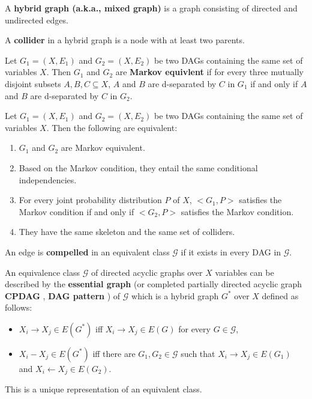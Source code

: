 \begin{definition}
A \textbf{hybrid graph (a.k.a., mixed graph)} is a graph consisting of directed and undirected edges. 
\end{definition}

\begin{definition}
A \textbf{collider} in a hybrid graph is a node with at least two parents. 
\end{definition}

\begin{definition}
Let $G_1 = (X, E_1)$ and $G_2 = (X, E_2)$ be two DAGs containing the same set of variables $X$. Then $G_1$ and $G_2$ are \textbf{Markov equivlent} if for every three mutually disjoint subsets $A, B, C \subseteq X$, $A$ and $B$ are d-separated by $C$ in $G_1$ if and only if $A$ and $B$ are d-separated by $C$ in $G_2$.
\end{definition}

\begin{proposition}
Let $G_1 = (X, E_1)$ and $G_2 = (X, E_2)$ be two DAGs containing the same set of variables $X$. Then the following are equivalent:
\begin{enumerate}
\item $G_1$ and $G_2$ are Markov equivalent. 
\item Based on the Markov condition, they entail the same conditional independencies. 
\item For every joint probability distribution $P$ of $X$, $<G_1, P>$ satisfies the Markov condition if and only if $<G_2, P>$ satisfies the Markov condition. 
\item They have the same skeleton and the same set of colliders. 
\end{enumerate}
\end{proposition}

\begin{definition}
An edge is \textbf{compelled} in an equivalent class $\mathcal{G}$ if it exists in every DAG in $\mathcal{G}$. 
\end{definition}

\begin{definition}
An equivalence class $\mathcal{G}$ of directed acyclic graphs over $X$ variables can be described by the \textbf{essential graph} \cite{andersson1997characterization} (or completed partially directed acyclic graph \textbf{CPDAG} \cite{chickering2002optimal}, \textbf{DAG pattern} \cite{neapolitan2004learning}) of $\mathcal{G}$ which is a hybrid graph $G^*$ over $X$ defined as follows: 
\begin{itemize}
\item $X_i \rightarrow X_j \in E(G^*)$ iff $X_i \rightarrow X_j \in E(G)$ for every $G \in \mathcal{G}$,
\item $X_i - X_j \in E(G^*)$ iff there are $G_1, G_2 \in \mathcal{G}$ such that $X_i \rightarrow X_j \in E(G_1)$ and  $X_i \leftarrow X_j \in E(G_2)$.
\end{itemize}
\end{definition}
This is a unique representation of an equivalent class. 

